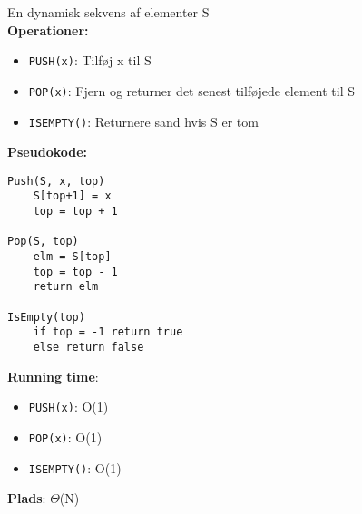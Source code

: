 En dynamisk sekvens af elementer S\\
\textbf{Operationer:}
\begin{itemize}
	\item \texttt{PUSH(x)}: Tilføj x til S
	\item \texttt{POP(x)}: Fjern og returner det senest tilføjede element til S
	\item \texttt{ISEMPTY()}: Returnere sand hvis S er tom
\end{itemize}
\textbf{Pseudokode:}
\begin{lstlisting}[frame=single, mathescape=true]
Push(S, x, top)
	S[top+1] = x
	top = top + 1

Pop(S, top)
	elm = S[top]
	top = top - 1
	return elm

IsEmpty(top)
	if top = -1 return true
	else return false
\end{lstlisting}
\textbf{Running time}:
\begin{itemize}
	\item \texttt{PUSH(x)}: O(1)
	\item \texttt{POP(x)}: O(1)
	\item \texttt{ISEMPTY()}: O(1)
\end{itemize}
\textbf{Plads}: $\Theta$(N)
